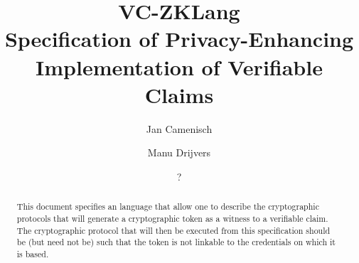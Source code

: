 \documentclass[a4paper]{article}
\theoremstyle{definition}
\begin{document}
\title{VC-ZKLang\\  \large Specification of Privacy-Enhancing Implementation of Verifiable Claims}

\author{Jan Camenisch \and Manu Drijvers \and ?}


\maketitle

%
\begin{abstract}
This document specifies an language that allow one to describe the cryptographic protocols
that will generate a cryptographic token as a witness to a verifiable claim.
The cryptographic protocol that will then be executed from this specification should be (but need not be) 
such that the token is not linkable to the credentials on which it is based.
\end{abstract}

\newpage
\tableofcontents
\newpage







%
%

%
%



\newpage



%
\end{document}
